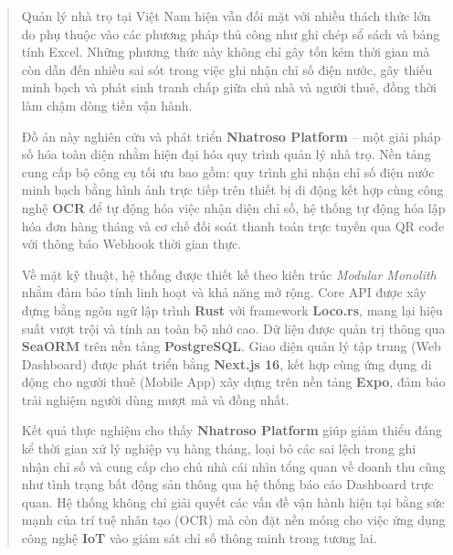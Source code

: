 \begin{abstract}

Quản lý nhà trọ tại Việt Nam hiện vẫn đối mặt với nhiều thách thức lớn do phụ thuộc vào các phương pháp thủ công như ghi chép sổ sách và bảng tính Excel. Những phương thức này không chỉ gây tốn kém thời gian mà còn dẫn đến nhiều sai sót trong việc ghi nhận chỉ số điện nước, gây thiếu minh bạch và phát sinh tranh chấp giữa chủ nhà và người thuê, đồng thời làm chậm dòng tiền vận hành.

Đồ án này nghiên cứu và phát triển \textbf{Nhatroso Platform} – một giải pháp số hóa toàn diện nhằm hiện đại hóa quy trình quản lý nhà trọ. Nền tảng cung cấp bộ công cụ tối ưu bao gồm: quy trình ghi nhận chỉ số điện nước minh bạch bằng hình ảnh trực tiếp trên thiết bị di động kết hợp cùng công nghệ \textbf{OCR} để tự động hóa việc nhận diện chỉ số, hệ thống tự động hóa lập hóa đơn hàng tháng và cơ chế đối soát thanh toán trực tuyến qua QR code với thông báo Webhook thời gian thực.

Về mặt kỹ thuật, hệ thống được thiết kế theo kiến trúc \textit{Modular Monolith} nhằm đảm bảo tính linh hoạt và khả năng mở rộng. Core API được xây dựng bằng ngôn ngữ lập trình \textbf{Rust} với framework \textbf{Loco.rs}, mang lại hiệu suất vượt trội và tính an toàn bộ nhớ cao. Dữ liệu được quản trị thông qua \textbf{SeaORM} trên nền tảng \textbf{PostgreSQL}. Giao diện quản lý tập trung (Web Dashboard) được phát triển bằng \textbf{Next.js 16}, kết hợp cùng ứng dụng di động cho người thuê (Mobile App) xây dựng trên nền tảng \textbf{Expo}, đảm bảo trải nghiệm người dùng mượt mà và đồng nhất.

Kết quả thực nghiệm cho thấy \textbf{Nhatroso Platform} giúp giảm thiểu đáng kể thời gian xử lý nghiệp vụ hàng tháng, loại bỏ các sai lệch trong ghi nhận chỉ số và cung cấp cho chủ nhà cái nhìn tổng quan về doanh thu cũng như tình trạng bất động sản thông qua hệ thống báo cáo Dashboard trực quan. Hệ thống không chỉ giải quyết các vấn đề vận hành hiện tại bằng sức mạnh của trí tuệ nhân tạo (OCR) mà còn đặt nền móng cho việc ứng dụng công nghệ \textbf{IoT} vào giám sát chỉ số thông minh trong tương lai.

\end{abstract}
\newpage

